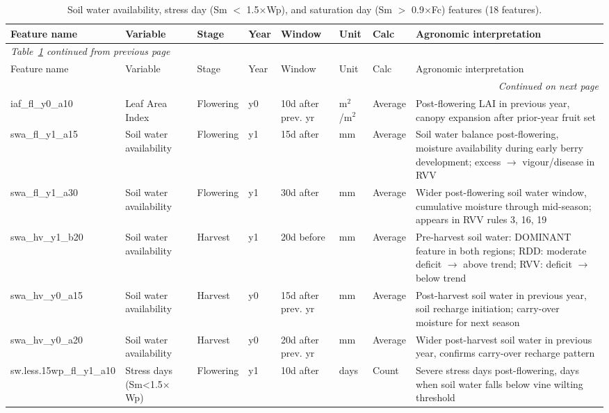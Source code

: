 {\footnotesize
\setlength{\tabcolsep}{3pt}
\begin{longtable}{p{2.2cm}|p{1.5cm}|p{1.2cm}|p{0.4cm}|p{1.4cm}|p{0.7cm}|p{0.9cm}|p{4.8cm}}
\caption{Soil water availability, stress day (Sm $<$ 1.5$\times$Wp), and saturation day (Sm $>$ 0.9$\times$Fc) features (18 features).}\label{tab:appc_6}\\
\toprule
Feature name & Variable & Stage & Year & Window & Unit & Calc & Agronomic interpretation \\
\midrule
\endfirsthead
\multicolumn{8}{l}{\textit{Table~\ref{tab:appc_6} continued from previous page}}\\
\toprule
Feature name & Variable & Stage & Year & Window & Unit & Calc & Agronomic interpretation \\
\midrule
\endhead
\midrule
\multicolumn{8}{r}{\textit{Continued on next page}}\\
\endfoot
\bottomrule
\endlastfoot
iaf\_fl\_y0\_a10 & Leaf Area Index & Flowering & y0 & 10d after prev. yr & m$^2$/m$^2$ & Average & Post-flowering LAI in previous year, canopy expansion after prior-year fruit set \\
swa\_fl\_y1\_a15 & Soil water availability & Flowering & y1 & 15d after & mm & Average & Soil water balance post-flowering, moisture availability during early berry development; excess $\rightarrow$ vigour/disease in RVV \\
swa\_fl\_y1\_a30 & Soil water availability & Flowering & y1 & 30d after & mm & Average & Wider post-flowering soil water window, cumulative moisture through mid-season; appears in RVV rules 3, 16, 19 \\
swa\_hv\_y1\_b20 & Soil water availability & Harvest & y1 & 20d before & mm & Average & Pre-harvest soil water: DOMINANT feature in both regions; RDD: moderate deficit $\rightarrow$ above trend; RVV: deficit $\rightarrow$ below trend \\
swa\_hv\_y0\_a15 & Soil water availability & Harvest & y0 & 15d after prev. yr & mm & Average & Post-harvest soil water in previous year, soil recharge initiation; carry-over moisture for next season \\
swa\_hv\_y0\_a20 & Soil water availability & Harvest & y0 & 20d after prev. yr & mm & Average & Wider post-harvest soil water in previous year, confirms carry-over recharge pattern \\
sw.less.15wp\_fl\_y1\_a10 & Stress days (Sm<1.5$\times$Wp) & Flowering & y1 & 10d after & days & Count & Severe stress days post-flowering, days when soil water falls below vine wilting threshold \\

\end{longtable}}
